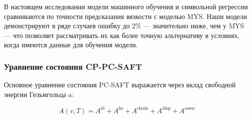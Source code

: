 \documentclass[a4paper,12pt]{article}
\begin{document}
      В настоящем исследовании модели машинного обучения и символьной регрессии сравниваются по точности предсказания вязкости с моделью MYS. Наши модели демонстрируют в ряде случаев ошибку до 2\% — значительно ниже, чем у MYS — что позволяет рассматривать их как более точную альтернативу в условиях, когда имеются данные для обучения модели.
      
    \subsubsection{Уравнение состояния CP-PC-SAFT}
    
    Основное уравнение состояния PC-SAFT выражается через вклад свободной энергии Гельмгольца \( a \):
    
    \begin{equation}
    A(v, T) = A^{\text{id}} + A^{\text{hs}} + A^{\text{chain}} + A^{\text{disp}} + A^{\text{assoc}}
    \end{equation}
    
\end{document}
